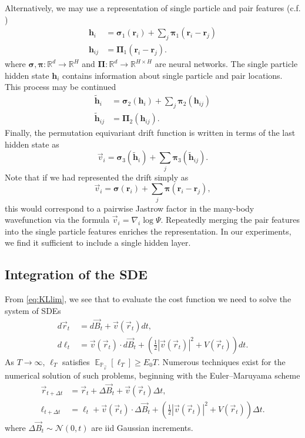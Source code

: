 \documentclass[12pt]{msml2020} %
\DeclareMathOperator*{\E}{\mathbb{E}}
\newcommand*{\bv}{\vec{v}}
\begin{document}
Alternatively, we may use a representation of single particle and pair features (c.f. \cite{Pfau:2019aa})
%
\begin{align}
\mathbf{h}_i &= \boldsymbol{\sigma}_1(\mathbf{r}_i) + \sum_j \boldsymbol{\pi}_1(\mathbf{r}_i-\mathbf{r}_j)\\
\mathbf{h}_{ij} &= \boldsymbol{\Pi}_1(\mathbf{r}_i-\mathbf{r}_j).
\end{align}
%
where $\boldsymbol{\sigma}, \boldsymbol{\pi}:\mathbb{R}^d\to \mathbb{R}^H$ and $\boldsymbol{\Pi}:\mathbb{R}^d\to \mathbb{R}^{H\times H}$ are neural networks. The single particle hidden state $\mathbf{h}_i$ contains information about single particle and pair locations. This process may be continued
%
\begin{align}
\tilde{\mathbf{h}}_i &= \boldsymbol{\sigma}_2(\mathbf{h}_i) + \sum_j \boldsymbol{\pi}_2(\mathbf{h}_{ij})\\
\tilde{\mathbf{h}}_{ij} &= \boldsymbol{\Pi}_2(\mathbf{h}_{ij}).
\end{align}
%
Finally, the permutation equivariant drift function is written in terms of the last hidden state as
%
\begin{equation}
\bv_i = \boldsymbol{\sigma}_3(\tilde{\mathbf{h}}_i) + \sum_j \boldsymbol{\pi}_3(\tilde{\mathbf{h}}_{ij}).
\end{equation}
%
Note that if we had represented the drift simply as
%
$$
\bv_i = \boldsymbol{\sigma}(\mathbf{r}_i) + \sum_j \boldsymbol{\pi}(\mathbf{r}_i-\mathbf{r}_j),
$$
this would correspond to a pairwise Jastrow factor in the many-body wavefunction via the formula $\bv_i=\nabla_i \log\Psi$. Repeatedly merging the pair features into the single particle features enriches the representation. In our experiments, we find it sufficient to include a single hidden layer. 

\subsection{Integration of the SDE} \label{sec:int}

From \eqref{eq:KLlim}, we see that to evaluate the cost function we need to solve the system of SDEs
%
\begin{align}\label{eq:sde_system}
  d\vec{r}_t &= d\vec{B}_t + \vec{v}(\vec{r}_t)dt,\nonumber\\
  d\ell_t &= \vec{v}(\vec{r}_t)\cdot d\vec{B}_t + \left(\frac{1}{2}|\vec{v}(\vec{r}_t)|^2 + V(\vec{r}_t)\right)dt.
\end{align}
%
As $T\to\infty$, $\ell_T$ satisfies $\E_{\mathbb{P}_{\bv}}\left[\ell_T\right]\geq E_0 T$. Numerous techniques exist for the numerical solution of such problems, beginning with the Euler--Maruyama scheme
%
\begin{align}\label{eq:em}
    \vec{r}_{t+\Delta t} &= \vec{r}_{t} + \Delta\vec{B}_t + \vec{v}(\vec{r}_t)\Delta t,\nonumber\\
    \ell_{t+\Delta t} &= \ell_{t} + \vec{v}(\vec{r}_t)\cdot \Delta\vec{B}_t +\left(\frac{1}{2}|\vec{v}(\vec{r}_t)|^2 + V(\vec{r}_t)\right)\Delta t.
\end{align}
%
where $\Delta\vec{B}_t\sim \mathcal{N}(0,t)$ are iid Gaussian increments. 
\end{document}
